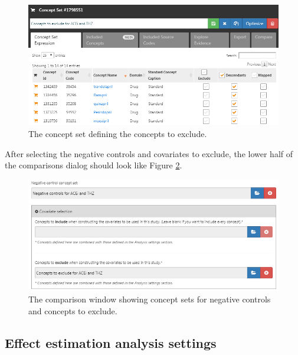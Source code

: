 \documentclass[11pt]{book}
\theoremstyle{definition}
\theoremstyle{definition}
\theoremstyle{definition}
\theoremstyle{remark}
\begin{document}
\begin{figure}

{\centering \includegraphics[width=1\linewidth]{images/PopulationLevelEstimation/covsToExclude} 

}

\caption{The concept set defining the concepts to exclude.}\label{fig:covsToExclude}
\end{figure}

After selecting the negative controls and covariates to exclude, the lower half of the comparisons dialog should look like Figure \ref{fig:comparisons2}.

\begin{figure}

{\centering \includegraphics[width=1\linewidth]{images/PopulationLevelEstimation/comparisons2} 

}

\caption{The comparison window showing concept sets for negative controls and concepts to exclude.}\label{fig:comparisons2}
\end{figure}

\hypertarget{effect-estimation-analysis-settings}{%
\subsection{Effect estimation analysis settings}\label{effect-estimation-analysis-settings}}
\end{document}
